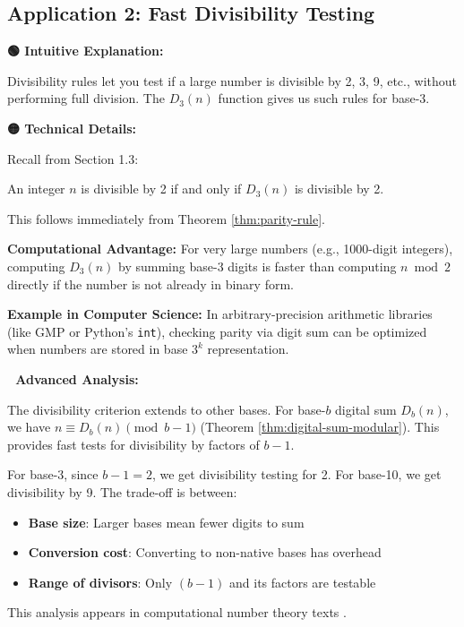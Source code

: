 \subsection{Application 2: Fast Divisibility Testing}

\textbf{🟢 Intuitive Explanation:}

Divisibility rules let you test if a large number is divisible by 2, 3, 9, etc., without performing full division. The $D_3(n)$ function gives us such rules for base-3.

\textbf{🟡 Technical Details:}

Recall from Section 1.3:

\begin{theorem}
\label{thm:div-by-2-app}
An integer $n$ is divisible by 2 if and only if $D_3(n)$ is divisible by 2.
\end{theorem}

This follows immediately from Theorem \ref{thm:parity-rule}.

\textbf{Computational Advantage:} For very large numbers (e.g., 1000-digit integers), computing $D_3(n)$ by summing base-3 digits is faster than computing $n \bmod 2$ directly if the number is not already in binary form.

\textbf{Example in Computer Science:} In arbitrary-precision arithmetic libraries (like GMP or Python's \texttt{int}), checking parity via digit sum can be optimized when numbers are stored in base $3^k$ representation.

\textbf{🔴 Advanced Analysis:}

The divisibility criterion extends to other bases. For base-$b$ digital sum $D_b(n)$, we have $n \equiv D_b(n) \pmod{b-1}$ (Theorem \ref{thm:digital-sum-modular}). This provides fast tests for divisibility by factors of $b-1$.

For base-3, since $b-1 = 2$, we get divisibility testing for 2. For base-10, we get divisibility by 9. The trade-off is between:
\begin{itemize}
\item \textbf{Base size}: Larger bases mean fewer digits to sum
\item \textbf{Conversion cost}: Converting to non-native bases has overhead
\item \textbf{Range of divisors}: Only $(b-1)$ and its factors are testable
\end{itemize}

This analysis appears in computational number theory texts \cite{crandall2005}.

